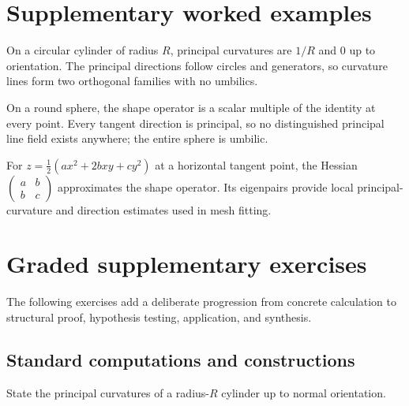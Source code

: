 \section{Supplementary worked examples}
\label{sec:vii42-pedagogy}

\begin{example}\label{ex:vii42-ped-01}
On a circular cylinder of radius \(R\), principal curvatures are \(1/R\) and \(0\) up to orientation.  The principal directions follow circles and generators, so curvature lines form two orthogonal families with no umbilics.
\end{example}

\begin{example}\label{ex:vii42-ped-02}
On a round sphere, the shape operator is a scalar multiple of the identity at every point.  Every tangent direction is principal, so no distinguished principal line field exists anywhere; the entire sphere is umbilic.
\end{example}

\begin{example}\label{ex:vii42-ped-03}
For \(z=\tfrac12(ax^2+2bxy+cy^2)\) at a horizontal tangent point, the Hessian \(\begin{pmatrix}a&b\\b&c\end{pmatrix}\) approximates the shape operator.  Its eigenpairs provide local principal-curvature and direction estimates used in mesh fitting.
\end{example}

\section{Graded supplementary exercises}
The following exercises add a deliberate progression from concrete calculation to structural proof, hypothesis testing, application, and synthesis.

\subsection*{Standard computations and constructions}

\begin{exercise}\label{exr:vii42-ped-01}
State the principal curvatures of a radius-\(R\) cylinder up to normal orientation.
\end{exercise}

